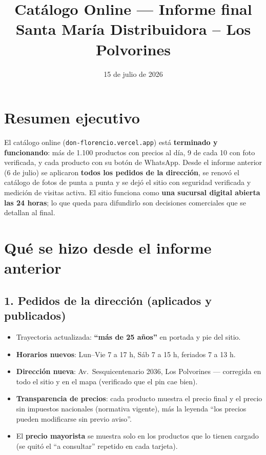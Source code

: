 \documentclass[a4paper,11pt]{article}
\title{\color{vino}\textbf{Cat\'alogo Online --- Informe final}\\[4pt]
\large Santa Mar\'ia Distribuidora \--- Los Polvorines}
\author{}
\date{15 de julio de 2026}
\begin{document}
\maketitle
\vspace{-2.5em}

\section*{Resumen ejecutivo}

El cat\'alogo online (\texttt{don-florencio.vercel.app}) est\'a \textbf{terminado y
funcionando}: m\'as de 1.100 productos con precios al d\'ia, 9 de cada 10 con foto
verificada, y cada producto con su bot\'on de WhatsApp. Desde el informe anterior
(6 de julio) se aplicaron \textbf{todos los pedidos de la direcci\'on}, se renov\'o el
cat\'alogo de fotos de punta a punta y se dej\'o el sitio con seguridad verificada y
medici\'on de visitas activa. El sitio funciona como \textbf{una sucursal digital
abierta las 24 horas}; lo que queda para difundirlo son decisiones comerciales que se
detallan al final.

\section{Qu\'e se hizo desde el informe anterior}

\subsection*{1. Pedidos de la direcci\'on (aplicados y publicados)}
\begin{itemize}[leftmargin=1.2em, itemsep=2pt]
  \item Trayectoria actualizada: \textbf{``m\'as de 25 a\~nos''} en portada y pie del sitio.
  \item \textbf{Horarios nuevos}: Lun--Vie 7 a 17 h, S\'ab 7 a 15 h, feriados 7 a 13 h.
  \item \textbf{Direcci\'on nueva}: Av.\ Sesquicentenario 2036, Los Polvorines ---
        corregida en todo el sitio y en el mapa (verificado que el pin cae bien).
  \item \textbf{Transparencia de precios}: cada producto muestra el precio final y el
        precio sin impuestos nacionales (normativa vigente), m\'as la leyenda
        ``los precios pueden modificarse sin previo aviso''.
  \item El \textbf{precio mayorista} se muestra solo en los productos que lo tienen
        cargado (se quit\'o el ``a consultar'' repetido en cada tarjeta).
\end{itemize}
\end{document}
